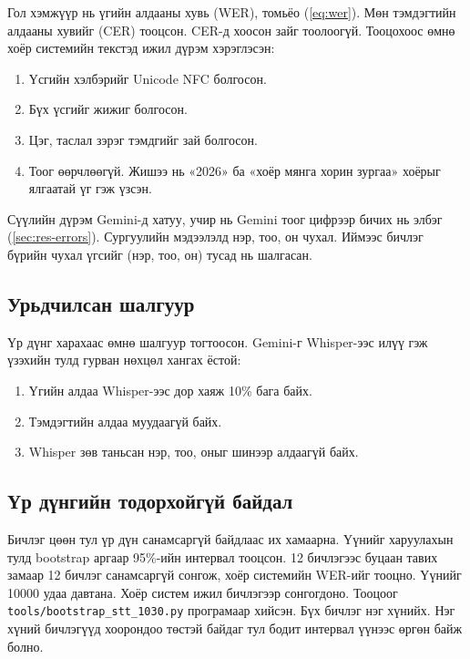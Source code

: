 Гол хэмжүүр нь үгийн алдааны хувь (\ac{WER}), томьёо (\ref{eq:wer}). Мөн тэмдэгтийн алдааны хувийг (\ac{CER}) тооцсон. CER-д хоосон зайг тоолоогүй. Тооцохоос өмнө хоёр системийн текстэд ижил дүрэм хэрэглэсэн:
\begin{enumerate}
    \item Үсгийн хэлбэрийг Unicode NFC болгосон.
    \item Бүх үсгийг жижиг болгосон.
    \item Цэг, таслал зэрэг тэмдгийг зай болгосон.
    \item Тоог өөрчлөөгүй. Жишээ нь «2026» ба «хоёр мянга хорин зургаа» хоёрыг ялгаатай үг гэж үзсэн.
\end{enumerate}
Сүүлийн дүрэм Gemini-д хатуу, учир нь Gemini тоог цифрээр бичих нь элбэг (\ref{sec:res-errors}). Сургуулийн мэдээлэлд нэр, тоо, он чухал. Иймээс бичлэг бүрийн чухал үгсийг (нэр, тоо, он) тусад нь шалгасан.

\subsection{Урьдчилсан шалгуур}
\label{sec:stt-criteria}

Үр дүнг харахаас өмнө шалгуур тогтоосон. Gemini-г Whisper-ээс илүү гэж үзэхийн тулд гурван нөхцөл хангах ёстой:
\begin{enumerate}
    \item Үгийн алдаа Whisper-ээс дор хаяж 10\% бага байх.
    \item Тэмдэгтийн алдаа муудаагүй байх.
    \item Whisper зөв таньсан нэр, тоо, оныг шинээр алдаагүй байх.
\end{enumerate}

\subsection{Үр дүнгийн тодорхойгүй байдал}
\label{sec:stt-ci}

Бичлэг цөөн тул үр дүн санамсаргүй байдлаас их хамаарна. Үүнийг харуулахын тулд bootstrap аргаар 95\%-ийн интервал тооцсон. 12 бичлэгээс буцаан тавих замаар 12 бичлэг санамсаргүй сонгож, хоёр системийн WER-ийг тооцно. Үүнийг 10000 удаа давтана. Хоёр систем ижил бичлэгээр сонгогдоно. Тооцоог \texttt{tools/\allowbreak bootstrap\_stt\_1030.py} програмаар хийсэн. Бүх бичлэг нэг хүнийх. Нэг хүний бичлэгүүд хоорондоо төстэй байдаг тул бодит интервал үүнээс өргөн байж болно.

